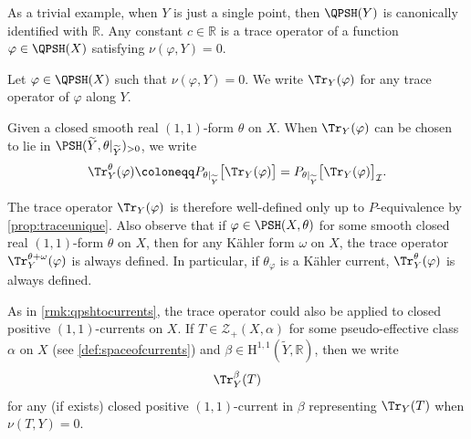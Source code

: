 \begin{example}
    As a trivial example, when $Y$ is just a single point, then $\QPSH(Y)$ is canonically identified with $\mathbb{R}$. Any constant $c\in \mathbb{R}$ is a trace operator of a function $\varphi\in \QPSH(X)$ satisfying $\nu(\varphi,Y)=0$.
\end{example}

\begin{definition}\label{def:traceop2}
    Let $\varphi\in \QPSH(X)$ such that $\nu(\varphi,Y)=0$. We write $\Tr_{Y}(\varphi)$ for any trace operator of $\varphi$ along $Y$.

    Given a closed smooth real $(1,1)$-form $\theta$ on $X$. When $\Tr_Y(\varphi)$ can be chosen to lie in $\PSH(\widetilde{Y},\theta|_{\widetilde{Y}})_{>0}$, we write
    \[
        \Tr_Y^{\theta}(\varphi)\coloneqq P_{\theta|_{\widetilde{Y}}}\bigl[ \Tr_Y(\varphi) \bigr]=P_{\theta|_{\widetilde{Y}}}\bigl[ \Tr_Y(\varphi) \bigr]_{\mathcal{I}}.
    \]
\end{definition}
The trace operator $\Tr_Y(\varphi)$ is therefore well-defined only up to $P$-equivalence by \cref{prop:traceunique}. Also observe that if $\varphi\in \PSH(X,\theta)$ for some smooth closed real $(1,1)$-form $\theta$ on $X$, then for any K\"ahler form $\omega$ on $X$, the trace operator $\Tr_Y^{\theta+\omega}(\varphi)$ is always defined. In particular, if $\theta_{\varphi}$ is a Kähler current, $\Tr^{\theta}_Y(\varphi)$ is always defined.


\begin{remark}\label{rmk:tracecurrent}
    As in \cref{rmk:qpshtocurrents}, the trace operator could also be applied to closed positive $(1,1)$-currents on $X$. If $T\in \mathcal{Z}_+(X,\alpha)$ for some pseudo-effective class $\alpha$ on $X$ (see \cref{def:spaceofcurrents}) and $\beta\in \mathrm{H}^{1,1}(\widetilde{Y},\mathbb{R})$, then we write
    \[
    \Tr^{\beta}_Y(T)
    \]
    for any (if exists) closed positive $(1,1)$-current in $\beta$ representing $\Tr_Y(T)$ when $\nu(T,Y)=0$.
\end{remark}




